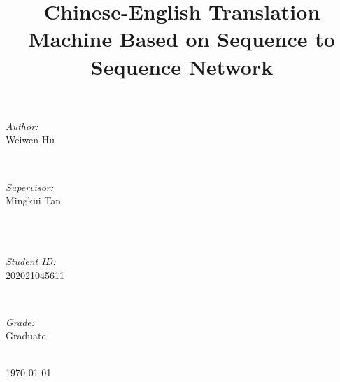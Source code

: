 \documentclass[journal, a4paper]{IEEEtran}
\begin{document}
\begin{titlepage}
\begin{minipage}{0.4\textwidth}
\begin{flushleft} \large
\emph{Author:}\\
Weiwen Hu
\end{flushleft}
\end{minipage}
~
\begin{minipage}{0.4\textwidth}
\begin{flushright} \large
\emph{Supervisor:} \\
Mingkui Tan
\end{flushright}
\end{minipage}\\[2cm]
~
\begin{minipage}{0.4\textwidth}
\begin{flushleft} \large
\emph{Student ID:}\\
202021045611
\end{flushleft}
\end{minipage}
~
\begin{minipage}{0.4\textwidth}
\begin{flushright} \large
\emph{Grade:} \\
Graduate
\end{flushright}
\end{minipage}\\[2cm]



{\large \today}\\[2cm] %



\vfill %

\end{titlepage}

	\title{Chinese-English Translation Machine Based on Sequence to Sequence Network}
	\maketitle
\end{document}
